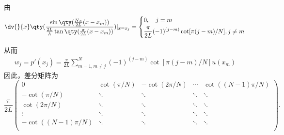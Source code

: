 由
\begin{equation}
\dv{}{x}\qty(\frac{\sin\qty(\frac{N\pi}{2L}(x-x_m))}{\frac{2L}{h}\tan\qty(\frac{\pi}{2L}(x-x_m))})|_{x=x_j}=\left\{\begin{aligned}
&0,\quad j=m\\
&\frac{\pi}{2L}(-1)^{(j-m)}\cot[\pi(j-m)/N],j\neq m
\end{aligned}\right.~
\end{equation}

从而
\begin{equation}
\begin{aligned}
w_j=p'(x_j)=\frac{\pi}{2L}\sum_{m=1,m\neq j}^{N}(-1)^{(j-m)}\cot[\pi(j-m)/N]u(x_m)
\end{aligned}~
\end{equation}
因此，差分矩阵为
\begin{equation}
\frac{\pi}{2L}
\begin{pmatrix}
0&\cot(\pi/N)&-\cot(2\pi/N)&\cdots&\cot((N-1)\pi/N)\\
-\cot(\pi/N)&\ddots&\ddots&\ddots&\ddots\\
\cot(2\pi/N)&\ddots&\ddots&\ddots&\ddots\\
\vdots&\ddots&\ddots&\ddots&\ddots\\
-\cot((N-1)\pi/N)&\ddots&\ddots&\ddots&\ddots\\
\end{pmatrix}.~
\end{equation}




































